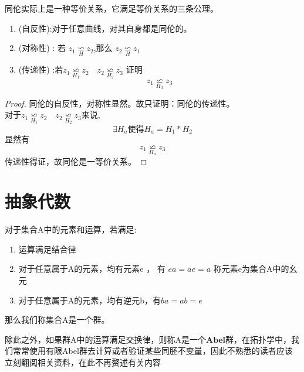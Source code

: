 \begin{remark}
    同伦实际上是一种等价关系，它满足等价关系的三条公理。
\end{remark}
\begin{proposition}[验证同伦是等价关系]
    \begin{enumerate}
        \item (自反性):对于任意曲线，对其自身都是同伦的。\\
        \item  (对称性) : 若  \(z_1 \mathop{\backsimeq}\limits_H z_2\),那么 \(z_2 \mathop{\backsimeq}\limits_H z_1\) \\
        \item (传递性) :若\(z_1 \mathop{\backsimeq}\limits_{H_1} z_2 \quad z_2 \mathop{\backsimeq}\limits_{H_2} z_3\) 证明
                        \[z_1 \mathop{\backsimeq}\limits_{H_3} z_3\]
    \end{enumerate}
\end{proposition}
\begin{proof}
    同伦的自反性，对称性显然。故只证明：同伦的传递性。\\
    对于\(z_1 \mathop{\backsimeq}\limits_{H_1} z_2 \quad z_2 \mathop{\backsimeq}\limits_{H_2} z_3\)来说,
    \[\exists H_a \text{使得}H_a=H_1*H_2\] 显然有 \[z_1 \mathop{\backsimeq}\limits_{H_a} z_3\]
    传递性得证，故同伦是一等价关系。
\end{proof}
\section{抽象代数}
\begin{definition}
    对于集合A中的元素和运算，若满足: \begin{enumerate}
        \item 运算满足结合律  \\
        \item 对于任意属于A的元素，均有元素e ， 有 \( ea = ae = a \) 称元素e为集合A中的幺元 \\
        \item 对于任意属于A的元素，均有逆元b，有\(ba=ab=e\)
    \end{enumerate}
    那么我们称集合A是一个群。
\end{definition}
除此之外，如果群A中的运算满足交换律，则称A是一个\(\mathbf{Abel群}\)，在拓扑学中，我们常常使用有限Abel群去计算或者验证某些同胚不变量，因此不熟悉的读者应该立刻翻阅相关资料，在此不再赘述有关内容